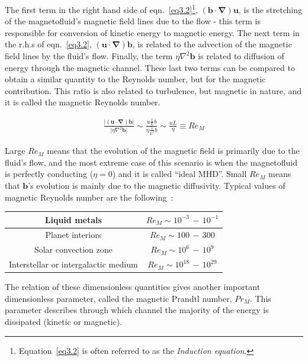 \documentclass[12pt,a4paper]{report}
\begin{document}
The first term in the right hand side of eqn.~\ref{eq3.2}\footnote{Equation~\ref{eq3.2} is often referred to as the \textit{Induction equation}.}, $(\bm b \cdot \bm \nabla)\bm u$, is the stretching of the magnetofluid's magnetic field lines due to the flow - this term is responsible for conversion of kinetic energy to magnetic energy. The next term in the r.h.s of eqn.~\ref{eq3.2}, $(\bm u \cdot \bm \nabla)\bm b$, is related to the advection of the magnetic field lines by the fluid's flow. Finally, the term $\eta \nabla^2 \bm b$ is related to diffusion of energy through the magnetic channel. These last two terms can be compared to obtain a similar quantity to the Reynolds number, but for the magnetic contribution. This ratio is also related to turbulence, but magnetic in nature, and it is called the magnetic Reynolds number. 

\begin{align}
 \frac{\vert (\bm u \cdot \bm \nabla) \bm b \vert}{\vert \eta \nabla^2 \bm b \vert} \sim \frac{u \frac{1}{L} b}{\eta \frac{1}{L^2} b} \sim \frac{u L}{\eta} \equiv Re_M \nonumber
\end{align}

Large $Re_M$ means that the evolution of the magnetic field is primarily due to the fluid's flow, and the most extreme case of this scenario is when the magnetofluid is perfectly conducting ($\eta = 0$) and it is called ``ideal MHD''. Small $Re_M$ means that $\bm b$'s evolution is mainly due to the magnetic diffusivity. Typical values of magnetic Reynolds number are the following~\cite{LinkmannMoritzFrederikLeon2016Spim}:

\begin{center}
\begin{tabular}{| c | c |}
 \hline
 Liquid metals & $Re_M \sim 10^{-3}\,-\,10^{-1}$ \\ 
 \hline
 Planet interiors & $Re_M \sim 100\,-\,300$ \\ 
 \hline
 Solar convection zone & $Re_M \sim 10^{6}\,-\,10^{9}$ \\ 
 \hline
 Interstellar or intergalactic medium & $Re_M \sim 10^{18}\,-\,10^{29}$ \\ 
 \hline
\end{tabular}
\end{center}

The relation of these dimensionless quantities gives another important dimensionless parameter, called the magnetic Prandtl number, $Pr_M$. This parameter describes through which channel the majority of the energy is dissipated (kinetic or magnetic).
\end{document}
